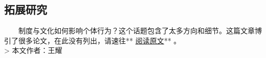 \documentclass[11pt]{article}
\begin{document}
    \subsection{拓展研究}\label{ux62d3ux5c55ux7814ux7a76}

    　　制度与文化如何影响个体行为？这个话题包含了太多方向和细节。这篇文章博引了很多论文，在此没有列出，请速往**
\href{http://files.meetup.com/19659955/CorruptionCorrupts_MainArticle_nature17160.pdf}{阅读原文}**
。\\
\textgreater{} 本文作者：王耀


    
    
    
    
\end{document}

